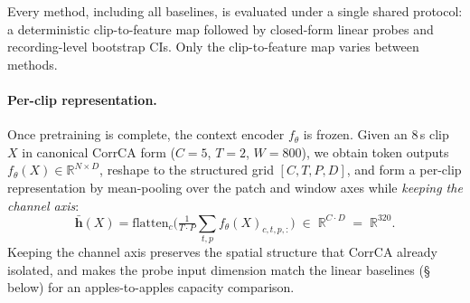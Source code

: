 Every method, including all baselines, is evaluated under a single
shared protocol: a deterministic clip-to-feature map followed by
closed-form linear probes and recording-level bootstrap CIs. Only
the clip-to-feature map varies between methods.

\paragraph{Per-clip representation.}
Once pretraining is complete, the context encoder $f_\theta$ is
frozen. Given an $8$\,s clip $X$ in canonical CorrCA form ($C{=}5$,
$T{=}2$, $W{=}800$), we obtain token outputs $f_\theta(X) \in
\mathbb{R}^{N \times D}$, reshape to the structured grid $[C, T, P,
D]$, and form a per-clip representation by mean-pooling over the
patch and window axes while \emph{keeping the channel axis}:
\begin{equation}
  \bar{\mathbf{h}}(X) = \mathrm{flatten}_c\!\Big(
      \tfrac{1}{T \cdot P}\!\sum_{t, p} f_\theta(X)_{c, t, p, :}
    \Big) \;\in\; \mathbb{R}^{C \cdot D}
  \;=\; \mathbb{R}^{320}.
\end{equation}
Keeping the channel axis preserves the spatial structure that CorrCA
already isolated, and makes the probe input dimension match the
linear baselines (\S\,below) for an apples-to-apples capacity
comparison.

